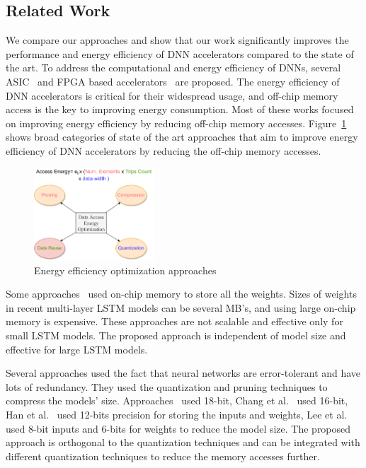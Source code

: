 \documentclass[a4paper,10pt]{article}
\begin{document}
\subsection{Related Work}
We compare our approaches and show that our work significantly improves the performance and energy efficiency of DNN accelerators compared to the state of the art. To address the computational and energy efficiency of DNNs, several ASIC~\cite{conti2018chipmunk,wang2017accelerating,azari2020elsa} and FPGA based accelerators~\cite{chang2015recurrent,ferreira2016fpga,lee2016fpga,guan2017fpga,han2017ese} are proposed. The energy efficiency of DNN accelerators is critical for their widespread usage, and off-chip memory access is the key to improving energy consumption. Most of these works focused on improving energy efficiency by reducing off-chip memory accesses. Figure~\ref{fig:dataEnergyRelatedWork} shows broad categories of state of the art approaches that aim to improve energy efficiency of DNN accelerators by reducing the off-chip memory accesses.
\begin{figure}[!htb]
	\centering
	\includegraphics[width=0.4\textwidth]{./images/dataEnergyOptRelatedWork}
	\caption{Energy efficiency optimization approaches}
	\label{fig:dataEnergyRelatedWork}
\end{figure}

Some approaches~\cite{lee2016fpga, rybalkin2018finn, ferreira2016fpga} used on-chip memory to store all the weights. Sizes of weights in recent multi-layer LSTM models can be several MB's, and using large on-chip memory is expensive. These approaches are not scalable and effective only for small LSTM models. The proposed approach is independent of model size and effective for large LSTM models.

Several approaches used the fact that neural networks are error-tolerant and have lots of redundancy. They used the quantization and pruning techniques to compress the models' size. Approaches~\cite{ferreira2016fpga,wang2018c} used 18-bit, Chang et al.~\cite{chang2015recurrent} used 16-bit, Han et al.~\cite{han2017ese} used 12-bits precision for storing the inputs and weights, Lee et al.~\cite{lee2016fpga} used 8-bit inputs and 6-bits for weights to reduce the model size. The proposed approach is orthogonal to the quantization techniques and can be integrated with different quantization techniques to reduce the memory accesses further. 
\end{document}
